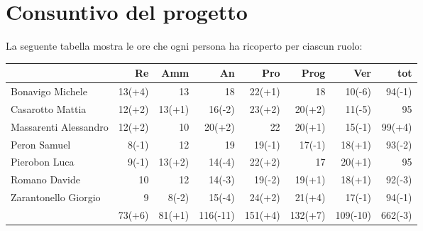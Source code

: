 \section{Consuntivo del progetto}

La seguente tabella mostra le ore che ogni persona ha ricoperto per ciascun ruolo:
\begin{table}[H]
    \begin{tabularx}{\linewidth}{X|rrrrrrr}
    \rowcolor{gray!30}& Re & Amm & An & Pro & Prog & Ver & tot \\
    \hline
    Bonavigo Michele                        & 13(+4)    & 13       & 18          & 22(+1)    & 18          & 10(-6)     & 94(-1) \\

    \rowcolor{gray!10}Casarotto Mattia      & 12(+2)    & 13(+1)   & 16(-2)      & 23(+2)    & 20(+2)      & 11(-5)     & 95 \\

    Massarenti Alessandro                   & 12(+2)    & 10       & 20(+2)      & 22        & 20(+1)      & 15(-1)     & 99(+4) \\

    \rowcolor{gray!10}Peron Samuel          & 8(-1)     & 12       & 19          & 19(-1)    & 17(-1)      & 18(+1)     & 93(-2) \\ 

    Pierobon Luca                           & 9(-1)     & 13(+2)   & 14(-4)      & 22(+2)    & 17          & 20(+1)     & 95 \\ 

    \rowcolor{gray!10}Romano Davide         & 10        & 12   & 14(-3)      & 19(-2)    & 19(+1)      & 18(+1)     & 92(-3) \\ 

    Zarantonello Giorgio                    & 9         & 8(-2)    & 15(-4)      & 24(+2)    & 21(+4)      & 17(-1)     & 94(-1) \\ 

    \hline                                  & 73(+6)    & 81(+1)   & 116(-11)    & 151(+4)   & 132(+7)     & 109(-10)   & 662(-3) \\  
    \end{tabularx}
\end{table} 


